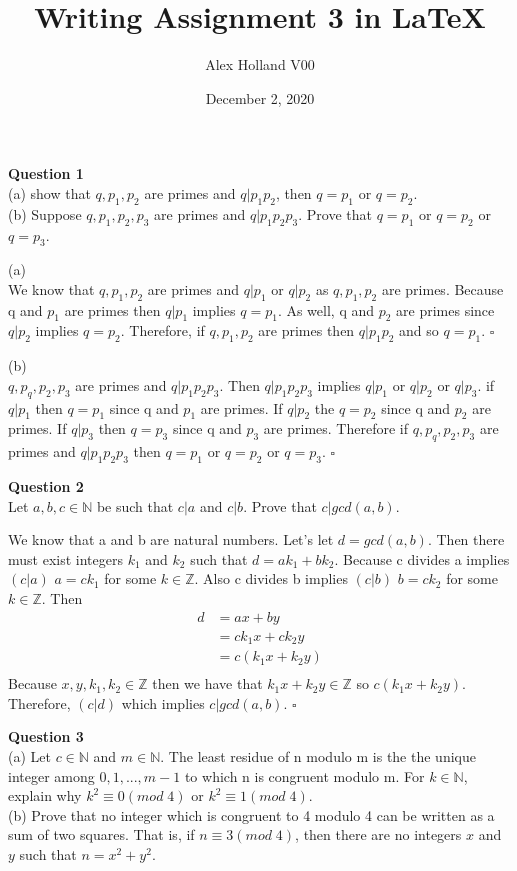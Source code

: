 \documentclass{article}
\title{Writing Assignment 3 in \LaTeX}
\author{Alex Holland V00 }
\date{December 2, 2020}
\begin{document}
\maketitle

\bigskip

{\bf Question 1}\\ 
(a) show that $q,p_1,p_2$ are primes and $q|p_1p_2$, then $q=p_1$ or $q=p_2$.\\
(b) Suppose $q,p_1,p_2,p_3$ are primes and $q|p_1p_2p_3$. Prove that $q=p_1$ or $q=p_2$ or $q=p_3$.


\smallskip
(a)\\
We know that $q,p_1,p_2$ are primes and $q|p_1$ or $q|p_2$ as $q,p_1,p_2$ are primes. Because q and $p_1$ are primes then $q|p_1$ implies $q=p_1$. As well, q and $p_2$ are primes since $q|p_2$ implies $q=p_2$. Therefore, if $q,p_1,p_2$ are primes then $q|p_1p_2$ and so $q=p_1$. $\square$

\smallskip
(b)\\
$q,p_q,p_2,p_3$ are primes and $q|p_1p_2p_3$. Then $q|p_1p_2p_3$ implies $q|p_1$ or $q|p_2$ or $q|p_3$. if $q|p_1$ then $q=p_1$ since q and $p_1$ are primes. If $q|p_2$ the $q=p_2$ since q and $p_2$ are primes. If $q|p_3$ then $q=p_3$ since q and $p_3$ are primes. Therefore if $q,p_q,p_2,p_3$ are primes and $q|p_1p_2p_3$ then $q=p_1$ or $q=p_2$ or $q=p_3$. $\square$

\bigskip
{\bf Question 2} \\
Let $a,b,c \in \mathbb{N}$ be such that $c|a$ and $c|b$. Prove that $c|gcd(a,b)$.

\smallskip
We know that a and b are natural numbers. Let's let $d=gcd(a,b)$. Then there must exist integers $k_1$ and $k_2$ such that $d=ak_1+bk_2$. Because c divides a  implies $(c|a)$ $a=ck_1$ for some $k\in\mathbb{Z}$. Also c divides b implies $(c|b)$ $b=ck_2$ for some $k\in\mathbb{Z}$. Then
\begin{equation*} 
\begin{split}
    d & =ax+by\\
    & = ck_1x+ck_2y\\
    & = c(k_1x+k_2y)\\
\end{split}
\end{equation*}
Because $x,y,k_1,k_2 \in \mathbb{Z}$ then we have that $k_1x+k_2y \in \mathbb{Z}$ so $c(k_1x+k_2y)$. Therefore, $(c|d)$ which implies $c|gcd(a,b)$. $\square$

\bigskip
{\bf Question 3}\\
(a) Let $c \in \mathbb{N}$ and $m \in \mathbb{N}$. The least residue of n modulo m is the the unique integer among $0,1,...,m-1$ to which n is congruent modulo m. For $k \in \mathbb{N}$, explain why $k^2\equiv0(mod\;4)$ or $k^2\equiv1(mod\;4)$.\\
(b) Prove that no integer which is congruent to 4 modulo 4 can be written as a sum of two squares. That is, if $n\equiv3(mod\;4)$, then there are no integers $x$ and $y$ such that $n=x^2+y^2$.
\end{document}
